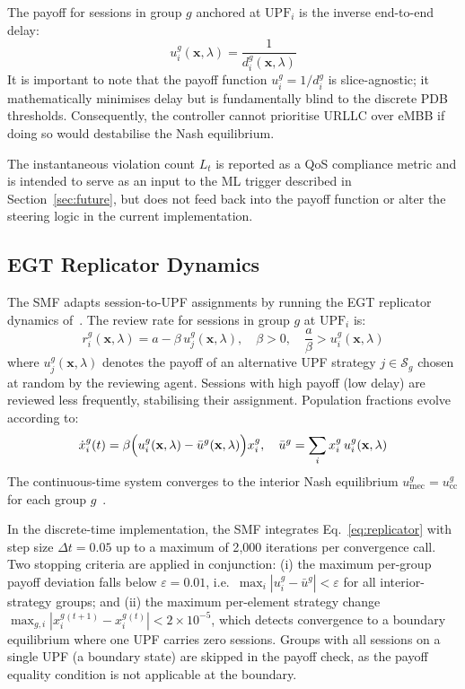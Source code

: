 \documentclass[conference]{IEEEtran}
\begin{document}
The payoff for sessions in group $g$ anchored at
$\text{UPF}_i$ is the inverse end-to-end delay:
\begin{equation}
    u_i^g(\mathbf{x},\lambda) =
    \frac{1}{d_i^g(\mathbf{x},\lambda)}
    \label{eq:payoff}
\end{equation}
It is important to note that the payoff function $u_i^g = 1/d_i^g$ is slice-agnostic; it mathematically minimises delay but is fundamentally blind to the discrete PDB thresholds. Consequently, the controller cannot prioritise URLLC over eMBB if doing so would destabilise the Nash equilibrium.

The instantaneous violation count $L_t$ is reported as
a QoS compliance metric and is intended to serve as an
input to the ML trigger described in
Section~\ref{sec:future}, but does not feed back into
the payoff function or alter the steering logic in the
current implementation.

\subsection{EGT Replicator Dynamics}
\label{sec:egt}

The SMF adapts session-to-UPF assignments by running the
EGT replicator dynamics of~\cite{Alevizaki2021upf}.
The review rate for sessions in group $g$ at
$\text{UPF}_i$ is:
\begin{equation}
    r_i^g(\mathbf{x},\lambda) =
    a - \beta\,u_j^g(\mathbf{x},\lambda),
    \quad \beta > 0,\quad
    \frac{a}{\beta} > u_i^g(\mathbf{x},\lambda)
    \label{eq:revrate}
\end{equation}
where $u_j^g(\mathbf{x},\lambda)$ denotes the payoff of an alternative UPF strategy $j \in \mathcal{S}_g$ chosen at random by the reviewing agent. Sessions with high payoff (low delay) are reviewed less
frequently, stabilising their assignment. Population
fractions evolve according to:
\begin{equation}
    \dot{x}_i^g(t) = \beta\Bigl(u_i^g(\mathbf{x},\lambda)
    - \bar{u}^g(\mathbf{x},\lambda)\Bigr)x_i^g, \quad
    \bar{u}^g = \sum_i x_i^g\,u_i^g(\mathbf{x},\lambda)
    \label{eq:replicator}
\end{equation}
The continuous-time system converges to the interior
Nash equilibrium $u_\text{mec}^g = u_\text{cc}^g$ for
each group $g$~\cite{Alevizaki2021upf}.

In the discrete-time implementation, the SMF integrates
Eq.~\eqref{eq:replicator} with step size $\Delta t = 0.05$
up to a maximum of 2{,}000 iterations per convergence
call. Two stopping criteria are applied in conjunction:
(i) the maximum per-group payoff deviation falls below
$\varepsilon = 0.01$, i.e.\
$\max_i |u_i^g - \bar{u}^g| < \varepsilon$ for all
interior-strategy groups; and (ii) the maximum
per-element strategy change $\max_{g,i}|x_i^g{}^{(t+1)}
- x_i^g{}^{(t)}| < 2\times10^{-5}$, which detects
convergence to a boundary equilibrium where one UPF
carries zero sessions. Groups with all sessions on a
single UPF (a boundary state) are skipped in the payoff
check, as the payoff equality condition is not applicable
at the boundary.
\end{document}
